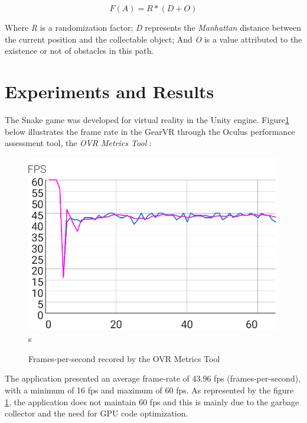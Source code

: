 \documentclass[runningheads]{llncs}
\begin{document}
\begin{equation}
F(A) = R * (D + O)
\label{equation11}
\end{equation}

Where \textit{R} is a randomization factor; \textit{D} represents the \textit{Manhattan} distance between the current position and the collectable object; And \textit{O} is a value attributed to the existence or not of obstacles in this path.

\section{Experiments and Results} \label{sec:results}
The Snake game was developed for virtual reality in the Unity engine. Figure\ref{fig:VRPerformanceChart}  below illustrates the frame rate in the GearVR through the Oculus performance assessment tool, the \textit{OVR Metrics Tool} \cite{ovrmetrictool}:

\begin{figure}[h] 
\centering
\includegraphics[width=\textwidth]{src/hci2020-images/VRPerformance.png}s
\caption{Frames-per-second recored by the OVR Metrics Tool}
\label{fig:VRPerformanceChart}
\end{figure}

The application presented an average frame-rate of 43.96 fps (frames-per-second), with a minimum of 16 fps and maximum of 60 fps. As represented by the figure \ref{fig:VRPerformanceChart}, the application does not maintain 60 fps and this is mainly due to the garbage collector and the need for GPU code optimization.

\end{document}
